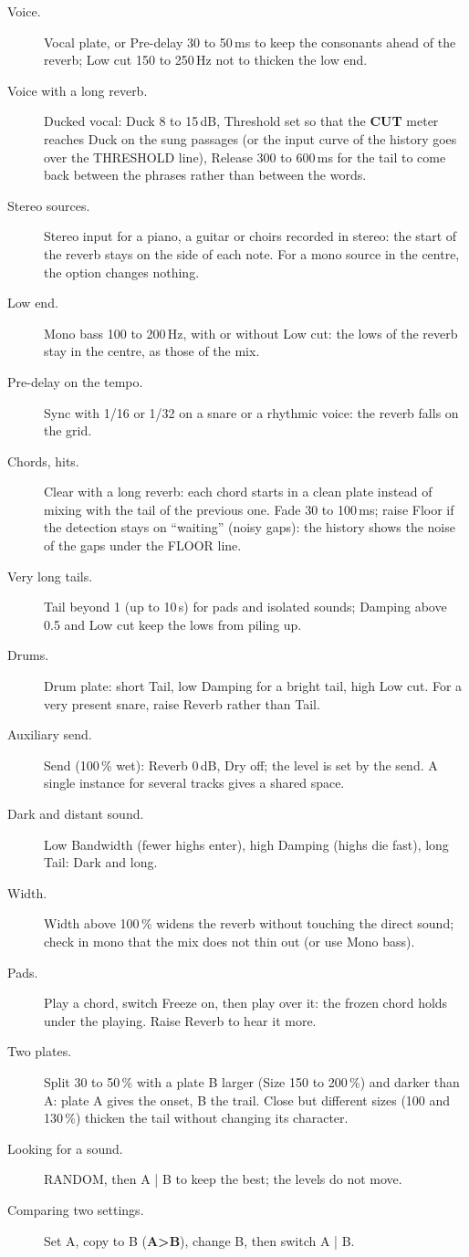 \documentclass[a4paper,11pt]{article}
\newcommand{\ctl}[1]{\textsf{\textbf{#1}}}   %
\newcommand{\dB}{\,dB}
\begin{document}
\begin{description}
\item[Voice.] Vocal plate, or Pre-delay 30 to 50\,ms to keep the consonants ahead of the
  reverb; Low cut 150 to 250\,Hz not to thicken the low end.
\item[Voice with a long reverb.] Ducked vocal: Duck 8 to 15\dB, Threshold set so that the
  \ctl{CUT} meter reaches Duck on the sung passages (or the input curve of the history goes over
  the THRESHOLD line), Release 300 to 600\,ms for the tail to come back between the phrases
  rather than between the words.
\item[Stereo sources.] Stereo input for a piano, a guitar or choirs recorded in stereo: the
  start of the reverb stays on the side of each note. For a mono source in the centre, the option
  changes nothing.
\item[Low end.] Mono bass 100 to 200\,Hz, with or without Low cut: the lows of the reverb stay in
  the centre, as those of the mix.
\item[Pre-delay on the tempo.] Sync with 1/16 or 1/32 on a snare or a rhythmic voice: the reverb
  falls on the grid.
\item[Chords, hits.] Clear with a long reverb: each chord starts in a clean plate instead of
  mixing with the tail of the previous one. Fade 30 to 100\,ms; raise Floor if the detection
  stays on ``waiting'' (noisy gaps): the history shows the noise of the gaps under the FLOOR
  line.
\item[Very long tails.] Tail beyond 1 (up to 10\,s) for pads and isolated sounds; Damping above
  0.5 and Low cut keep the lows from piling up.
\item[Drums.] Drum plate: short Tail, low Damping for a bright tail, high Low cut. For a very
  present snare, raise Reverb rather than Tail.
\item[Auxiliary send.] Send (100\,\% wet): Reverb 0\dB, Dry off; the level is set by the send.
  A single instance for several tracks gives a shared space.
\item[Dark and distant sound.] Low Bandwidth (fewer highs enter), high Damping (highs die fast),
  long Tail: Dark and long.
\item[Width.] Width above 100\,\% widens the reverb without touching the direct sound; check in
  mono that the mix does not thin out (or use Mono bass).
\item[Pads.] Play a chord, switch Freeze on, then play over it: the frozen chord holds under the
  playing. Raise Reverb to hear it more.
\item[Two plates.] Split 30 to 50\,\% with a plate B larger (Size 150 to 200\,\%) and darker
  than A: plate A gives the onset, B the trail. Close but different sizes (100 and 130\,\%)
  thicken the tail without changing its character.
\item[Looking for a sound.] RANDOM, then A | B to keep the best; the levels do not move.
\item[Comparing two settings.] Set A, copy to B (\ctl{A>B}), change B, then switch A | B.
\end{description}
\end{document}
